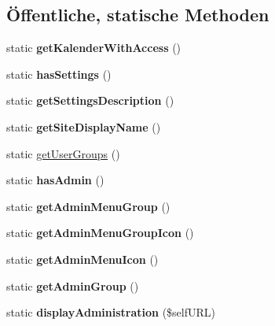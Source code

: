 \subsection*{Öffentliche, statische Methoden}
\begin{DoxyCompactItemize}
\item 
\mbox{\label{classandere_kalender_a3f273a3291f1bbaefbdcaee450aabad2}} 
static {\bfseries get\+Kalender\+With\+Access} ()
\item 
\mbox{\label{classandere_kalender_a5da4469a4f407821fdf15423938d8cb5}} 
static {\bfseries has\+Settings} ()
\item 
\mbox{\label{classandere_kalender_ab8452e60663edd0c472efa98ac5d7a3e}} 
static {\bfseries get\+Settings\+Description} ()
\item 
\mbox{\label{classandere_kalender_a62ba19693798a846e951b42cd3a2c860}} 
static {\bfseries get\+Site\+Display\+Name} ()
\item 
static \mbox{\hyperlink{classandere_kalender_af74f1d980abe9f70171bddcd7dad494a}{get\+User\+Groups}} ()
\item 
\mbox{\label{classandere_kalender_a25bb5de713f016a5d8e0757522fc1555}} 
static {\bfseries has\+Admin} ()
\item 
\mbox{\label{classandere_kalender_a393e53119c66585316a91c1030f25085}} 
static {\bfseries get\+Admin\+Menu\+Group} ()
\item 
\mbox{\label{classandere_kalender_ad598427569d4fef76dc29531b0431739}} 
static {\bfseries get\+Admin\+Menu\+Group\+Icon} ()
\item 
\mbox{\label{classandere_kalender_a79d618c929e2486a4b45700ea72c9600}} 
static {\bfseries get\+Admin\+Menu\+Icon} ()
\item 
\mbox{\label{classandere_kalender_abe51a23b1626f3c4241325b7210c7f73}} 
static {\bfseries get\+Admin\+Group} ()
\item 
\mbox{\label{classandere_kalender_abd0721d01121e00435c7e6942d9c82f5}} 
static {\bfseries display\+Administration} (\$self\+U\+RL)
\end{DoxyCompactItemize}
